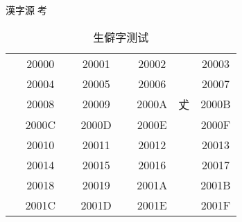 \documentclass{article}
\begin{document}
漢字源𣴑考


\begin{table}[ht]
\caption{生僻字测试}
\centering
\begin{tabular}{|cc|cc|cc|cc|}
𠀀 & 20000 & 𠀁 & 20001 & 𠀂 & 20002 & 𠀃 & 20003 \\
𠀄 & 20004 & 𠀅 & 20005 & 𠀆 & 20006 & 𠀇 & 20007 \\
𠀈 & 20008 & 𠀉 & 20009 & 𠀊 & 2000A & 𠀋 & 2000B \\
𠀌 & 2000C & 𠀍 & 2000D & 𠀎 & 2000E & 𠀏 & 2000F \\
𠀐 & 20010 & 𠀑 & 20011 & 𠀒 & 20012 & 𠀓 & 20013 \\
𠀔 & 20014 & 𠀕 & 20015 & 𠀖 & 20016 & 𠀗 & 20017 \\
𠀘 & 20018 & 𠀙 & 20019 & 𠀚 & 2001A & 𠀛 & 2001B \\
𠀜 & 2001C & 𠀝 & 2001D & 𠀞 & 2001E & 𠀟 & 2001F \\
\end{tabular}
\end{table}
\end{document}
